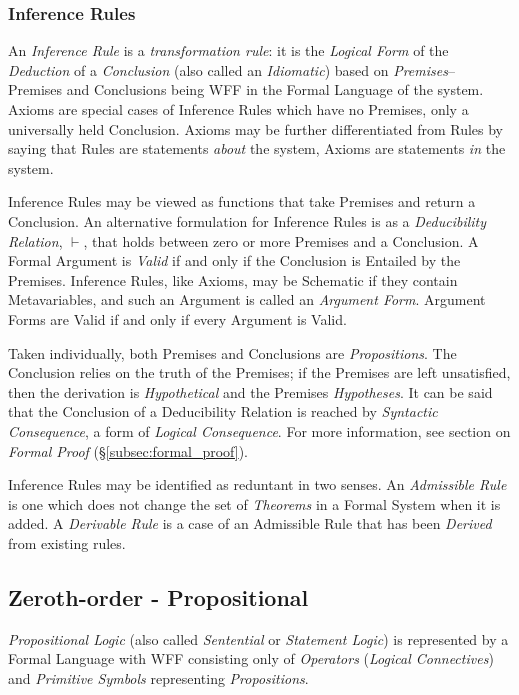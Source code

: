 \documentclass{article}
\begin{document}
\subsubsection{Inference Rules} \label{subsec:inference_rules}

An \emph{Inference Rule} is a \emph{transformation rule}: it is the
\emph{Logical Form} of the \emph{Deduction} of a \emph{Conclusion}
(also called an \emph{Idiomatic}) based on \emph{Premises}-- Premises
and Conclusions being WFF in the Formal Language of the system. Axioms
are special cases of Inference Rules which have no Premises, only a
universally held Conclusion. Axioms may be further differentiated from
Rules by saying that Rules are statements \emph{about} the system,
Axioms are statements \emph{in} the system.

Inference Rules may be viewed as functions that take Premises and
return a Conclusion. An alternative formulation for Inference Rules is
as a \emph{Deducibility Relation}, $\vdash$, that holds between zero
or more Premises and a Conclusion. A Formal Argument is \emph{Valid}
if and only if the Conclusion is Entailed by the Premises. Inference
Rules, like Axioms, may be Schematic if they contain Metavariables,
and such an Argument is called an \emph{Argument Form}. Argument Forms
are Valid if and only if every Argument is Valid.

Taken individually, both Premises and Conclusions are
\emph{Propositions}. The Conclusion relies on the truth of the
Premises; if the Premises are left unsatisfied, then the derivation is
\emph{Hypothetical} and the Premises \emph{Hypotheses}. It can be said
that the Conclusion of a Deducibility Relation is reached by
\emph{Syntactic Consequence}, a form of \emph{Logical
  Consequence}. For more information, see section on \emph{Formal
  Proof} (\S\ref{subsec:formal_proof}).

Inference Rules may be identified as reduntant in two senses. An
\emph{Admissible Rule} is one which does not change the set of
\emph{Theorems} in a Formal System when it is added. A \emph{Derivable
  Rule} is a case of an Admissible Rule that has been \emph{Derived}
from existing rules.

\subsection{Zeroth-order - Propositional}\label{subsec:propositional}

\emph{Propositional Logic} (also called \emph{Sentential} or
\emph{Statement Logic}) is represented by a Formal Language with WFF
consisting only of \emph{Operators} (\emph{Logical Connectives}) and
\emph{Primitive Symbols} representing \emph{Propositions}.
\end{document}
